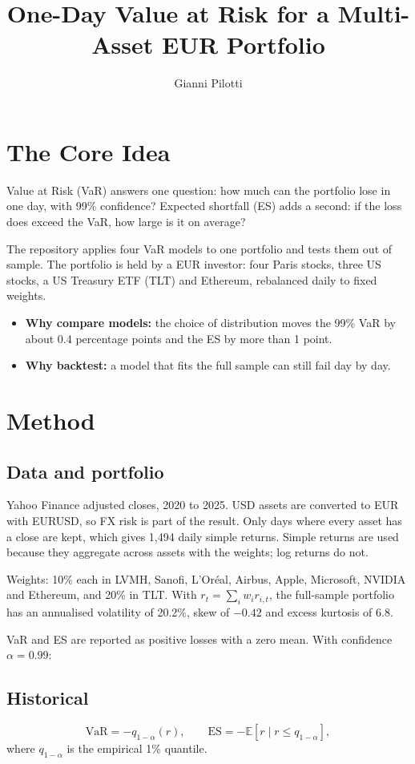 \documentclass[11pt,a4paper]{article}
\title{One-Day Value at Risk for a Multi-Asset EUR Portfolio}
\author{Gianni Pilotti}
\date{}
\begin{document}
\maketitle

\section{The Core Idea}
Value at Risk (VaR) answers one question: how much can the portfolio lose in one day, with 99\% confidence? Expected shortfall (ES) adds a second: if the loss does exceed the VaR, how large is it on average?

The repository applies four VaR models to one portfolio and tests them out of sample. The portfolio is held by a EUR investor: four Paris stocks, three US stocks, a US Treasury ETF (TLT) and Ethereum, rebalanced daily to fixed weights.

\begin{itemize}
\item \textbf{Why compare models:} the choice of distribution moves the 99\% VaR by about 0.4 percentage points and the ES by more than 1 point.
\item \textbf{Why backtest:} a model that fits the full sample can still fail day by day.
\end{itemize}

\section{Method}
\subsection{Data and portfolio}
Yahoo Finance adjusted closes, 2020 to 2025. USD assets are converted to EUR with EURUSD, so FX risk is part of the result. Only days where every asset has a close are kept, which gives 1,494 daily simple returns. Simple returns are used because they aggregate across assets with the weights; log returns do not.

Weights: 10\% each in LVMH, Sanofi, L'Or\'eal, Airbus, Apple, Microsoft, NVIDIA and Ethereum, and 20\% in TLT. With $r_t=\sum_i w_i r_{i,t}$, the full-sample portfolio has an annualised volatility of 20.2\%, skew of $-0.42$ and excess kurtosis of 6.8.

VaR and ES are reported as positive losses with a zero mean. With confidence $\alpha=0.99$:

\subsection{Historical}
\[
\mathrm{VaR}=-q_{1-\alpha}(r),\qquad
\mathrm{ES}=-\mathbb{E}\left[r \mid r\le q_{1-\alpha}\right],
\]
where $q_{1-\alpha}$ is the empirical 1\% quantile.
\end{document}
